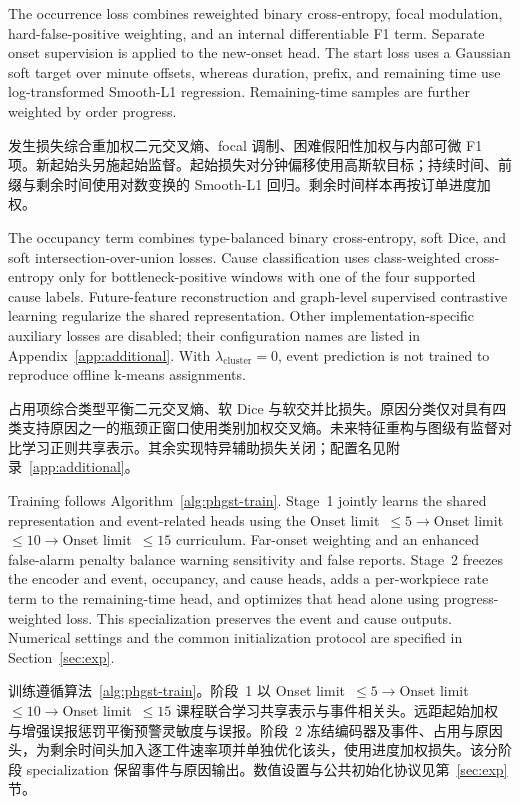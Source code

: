 \documentclass[a4paper,fleqn]{cas-dc}
\newcommand{\zhpara}[1]{%
  \par\begingroup\small\color{black!72}\noindent #1\par\endgroup}
\begin{document}
The occurrence loss combines reweighted binary cross-entropy, focal modulation, hard-false-positive weighting, and an internal differentiable F1 term. Separate onset supervision is applied to the new-onset head. The start loss uses a Gaussian soft target over minute offsets, whereas duration, prefix, and remaining time use log-transformed Smooth-L1 regression. Remaining-time samples are further weighted by order progress.

\zhpara{发生损失综合重加权二元交叉熵、focal 调制、困难假阳性加权与内部可微 F1 项。新起始头另施起始监督。起始损失对分钟偏移使用高斯软目标；持续时间、前缀与剩余时间使用对数变换的 Smooth-L1 回归。剩余时间样本再按订单进度加权。}


The occupancy term combines type-balanced binary cross-entropy, soft Dice, and soft intersection-over-union losses. Cause classification uses class-weighted cross-entropy only for bottleneck-positive windows with one of the four supported cause labels. Future-feature reconstruction and graph-level supervised contrastive learning regularize the shared representation. Other implementation-specific auxiliary losses are disabled; their configuration names are listed in Appendix~\ref{app:additional}. With $\lambda_{\mathrm{cluster}}=0$, event prediction is not trained to reproduce offline k-means assignments.

\zhpara{占用项综合类型平衡二元交叉熵、软 Dice 与软交并比损失。原因分类仅对具有四类支持原因之一的瓶颈正窗口使用类别加权交叉熵。未来特征重构与图级有监督对比学习正则共享表示。其余实现特异辅助损失关闭；配置名见附录~\ref{app:additional}。}


Training follows Algorithm~\ref{alg:phgst-train}. Stage~1 jointly learns the shared representation and event-related heads using the Onset limit~$\leq5\rightarrow$Onset limit~$\leq10\rightarrow$Onset limit~$\leq15$ curriculum. Far-onset weighting and an enhanced false-alarm penalty balance warning sensitivity and false reports. Stage~2 freezes the encoder and event, occupancy, and cause heads, adds a per-workpiece rate term to the remaining-time head, and optimizes that head alone using progress-weighted loss. This specialization preserves the event and cause outputs. Numerical settings and the common initialization protocol are specified in Section~\ref{sec:exp}.

\zhpara{训练遵循算法~\ref{alg:phgst-train}。阶段~1 以 Onset limit~$\leq5\rightarrow$Onset limit~$\leq10\rightarrow$Onset limit~$\leq15$ 课程联合学习共享表示与事件相关头。远距起始加权与增强误报惩罚平衡预警灵敏度与误报。阶段~2 冻结编码器及事件、占用与原因头，为剩余时间头加入逐工件速率项并单独优化该头，使用进度加权损失。该分阶段 specialization 保留事件与原因输出。数值设置与公共初始化协议见第~\ref{sec:exp} 节。}
\end{document}
